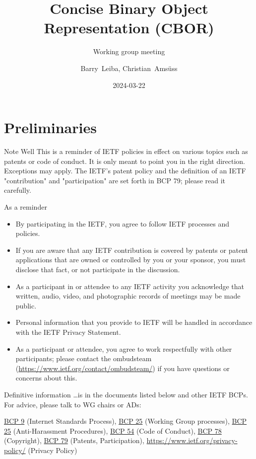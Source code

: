 \documentclass[aspectratio=169]{beamer}
\title{Concise Binary Object Representation (CBOR)}
\subtitle{Working group meeting}
\author{Barry~Leiba, Christian~Amsüss}
\institute{\normalsize{\theietf, Brisbane}}
\date{2024-03-22}
\begin{document}
\frame{\titlepage}

\section*{Preliminaries}

\begin{frame}{Note Well}\scriptsize
This is a reminder of IETF policies in effect on various topics such as patents or code of conduct. It is only meant to point you in the right direction. Exceptions may apply. The IETF's patent policy and the definition of an IETF "contribution" and "participation" are set forth in BCP 79; please read it carefully.

    \begin{block}{\small As a reminder\qquad\mbox{}}

    \vspace{-1.65em}

    \begin{itemize}
        \item By participating in the IETF, you agree to follow IETF processes and policies.
        \item If you are aware that any IETF contribution is covered by patents or patent applications that are owned or controlled by you or your sponsor, you must disclose that fact, or not participate in the discussion.
        \item As a participant in or attendee to any IETF activity you acknowledge that written, audio, video, and photographic records of meetings may be made public.
        \item Personal information that you provide to IETF will be handled in accordance with the IETF Privacy Statement.
        \item As a participant or attendee, you agree to work respectfully with other participants; please contact the ombudsteam (\url{https://www.ietf.org/contact/ombudsteam/}) if you have questions or concerns about this.
    \end{itemize}

    \end{block}

    \vspace{-1em}
    \begin{block}{\small Definitive information}
\ldots is in the documents listed below and other IETF BCPs. For advice, please talk to WG chairs or ADs:

\href{https://www.rfc-editor.org/info/bcp9}{BCP 9} (Internet Standards Process),
\href{https://www.rfc-editor.org/info/bcp25}{BCP 25} (Working Group processes),
\href{https://www.rfc-editor.org/info/bcp25}{BCP 25} (Anti-Harassment Procedures),
\href{https://www.rfc-editor.org/info/bcp54}{BCP 54} (Code of Conduct),
\href{https://www.rfc-editor.org/info/bcp78}{BCP 78} (Copyright),
\href{https://www.rfc-editor.org/info/bcp79}{BCP 79} (Patents, Participation),
\url{https://www.ietf.org/privacy-policy/} (Privacy Policy)
    \end{block}
\end{frame}
\end{document}
